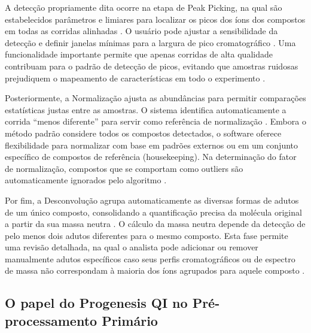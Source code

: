 A detecção propriamente dita ocorre na etapa de Peak Picking, na qual são estabelecidos parâmetros e limiares para localizar os picos dos íons dos compostos em todas as corridas alinhadas \cite{watersprogenesisguide}. O usuário pode ajustar a sensibilidade da detecção e definir janelas mínimas para a largura de pico cromatográfico \cite{watersprogenesisguide}. Uma funcionalidade importante permite que apenas corridas de alta qualidade contribuam para o padrão de detecção de picos, evitando que amostras ruidosas prejudiquem o mapeamento de características em todo o experimento \cite{watersprogenesisguide}.

Posteriormente, a Normalização ajusta as abundâncias para permitir comparações estatísticas justas entre as amostras. O sistema identifica automaticamente a corrida ``menos diferente'' para servir como referência de normalização \cite{watersprogenesisguide}. Embora o método padrão considere todos os compostos detectados, o software oferece flexibilidade para normalizar com base em padrões externos ou em um conjunto específico de compostos de referência (housekeeping). Na determinação do fator de normalização, compostos que se comportam como outliers são automaticamente ignorados pelo algoritmo \cite{watersprogenesisguide}.

Por fim, a Desconvolução agrupa automaticamente as diversas formas de adutos de um único composto, consolidando a quantificação precisa da molécula original a partir da sua massa neutra \cite{watersprogenesisguide}. O cálculo da massa neutra depende da detecção de pelo menos dois adutos diferentes para o mesmo composto. Esta fase permite uma revisão detalhada, na qual o analista pode adicionar ou remover manualmente adutos específicos caso seus perfis cromatográficos ou de espectro de massa não correspondam à maioria dos íons agrupados para aquele composto \cite{watersprogenesisguide}.

\subsection{O papel do Progenesis QI no Pré-processamento Primário }

